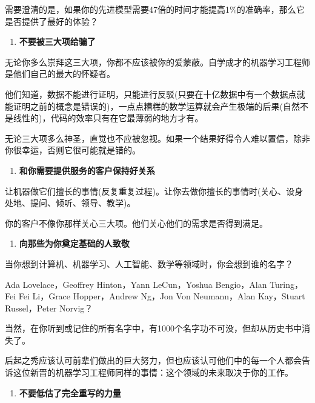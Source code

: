 \documentclass[]{ctexbook}
\providecommand{\tightlist}{%
  \setlength{\itemsep}{0pt}\setlength{\parskip}{0pt}}
\begin{document}
需要澄清的是，如果你的先进模型需要47倍的时间才能提高1\%的准确率，那么它是否提供了最好的体验？

\begin{enumerate}
\def\labelenumi{\arabic{enumi}.}
\setcounter{enumi}{2}
\tightlist
\item
  \textbf{不要被三大项给骗了}
\end{enumerate}

无论你多么崇拜这三大项，你都不应该被你的爱蒙蔽。自学成才的机器学习工程师是他们自己的最大的怀疑者。

他们知道，数据不能进行证明，只能进行反驳(只要在十亿数据中有一个数据点就能证明之前的概念是错误的)，一点点糟糕的数学运算就会产生极端的后果(自然不是线性的)，代码的效率只有在它最薄弱的地方才有。

无论三大项多么神圣，直觉也不应被忽视。如果一个结果好得令人难以置信，除非你很幸运，否则它很可能就是错的。

\begin{enumerate}
\def\labelenumi{\arabic{enumi}.}
\setcounter{enumi}{3}
\tightlist
\item
  \textbf{和你需要提供服务的客户保持好关系}
\end{enumerate}

让机器做它们擅长的事情(反复重复过程)。让你去做你擅长的事情时(关心、设身处地、提问、倾听、领导、教学)。

你的客户不像你那样关心三大项。他们关心他们的需求是否得到满足。

\begin{enumerate}
\def\labelenumi{\arabic{enumi}.}
\setcounter{enumi}{4}
\tightlist
\item
  \textbf{向那些为你奠定基础的人致敬}
\end{enumerate}

当你想到计算机、机器学习、人工智能、数学等领域时，你会想到谁的名字？

Ada Lovelace，Geoffrey Hinton，Yann LeCun，Yoshua Bengio，Alan Turing，Fei Fei Li，Grace Hopper，Andrew Ng，Jon Von Neumann，Alan Kay，Stuart Russel，Peter Norvig？

当然，在你听到或记住的所有名字中，有1000个名字功不可没，但却从历史书中消失了。

后起之秀应该认可前辈们做出的巨大努力，但也应该认可他们中的每一个人都会告诉这位新晋的机器学习工程师同样的事情：这个领域的未来取决于你的工作。

\begin{enumerate}
\def\labelenumi{\arabic{enumi}.}
\setcounter{enumi}{5}
\tightlist
\item
  \textbf{不要低估了完全重写的力量}
\end{enumerate}
\end{document}
